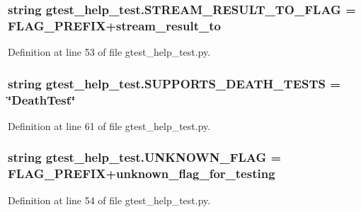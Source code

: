 \subsubsection[{\texorpdfstring{S\+T\+R\+E\+A\+M\+\_\+\+R\+E\+S\+U\+L\+T\+\_\+\+T\+O\+\_\+\+F\+L\+AG}{STREAM_RESULT_TO_FLAG}}]{\setlength{\rightskip}{0pt plus 5cm}string gtest\+\_\+help\+\_\+test.\+S\+T\+R\+E\+A\+M\+\_\+\+R\+E\+S\+U\+L\+T\+\_\+\+T\+O\+\_\+\+F\+L\+AG = {\bf F\+L\+A\+G\+\_\+\+P\+R\+E\+F\+IX}+\textquotesingle{}stream\+\_\+result\+\_\+to\textquotesingle{}}\hypertarget{namespacegtest__help__test_a06d67cce3cb57c484c169d1dbe4afd6c}{}\label{namespacegtest__help__test_a06d67cce3cb57c484c169d1dbe4afd6c}


Definition at line 53 of file gtest\+\_\+help\+\_\+test.\+py.

\subsubsection[{\texorpdfstring{S\+U\+P\+P\+O\+R\+T\+S\+\_\+\+D\+E\+A\+T\+H\+\_\+\+T\+E\+S\+TS}{SUPPORTS_DEATH_TESTS}}]{\setlength{\rightskip}{0pt plus 5cm}string gtest\+\_\+help\+\_\+test.\+S\+U\+P\+P\+O\+R\+T\+S\+\_\+\+D\+E\+A\+T\+H\+\_\+\+T\+E\+S\+TS = \char`\"{}Death\+Test\char`\"{}}\hypertarget{namespacegtest__help__test_a70c7e8b24ce75dfa26ff540b861cdc54}{}\label{namespacegtest__help__test_a70c7e8b24ce75dfa26ff540b861cdc54}


Definition at line 61 of file gtest\+\_\+help\+\_\+test.\+py.

\subsubsection[{\texorpdfstring{U\+N\+K\+N\+O\+W\+N\+\_\+\+F\+L\+AG}{UNKNOWN_FLAG}}]{\setlength{\rightskip}{0pt plus 5cm}string gtest\+\_\+help\+\_\+test.\+U\+N\+K\+N\+O\+W\+N\+\_\+\+F\+L\+AG = {\bf F\+L\+A\+G\+\_\+\+P\+R\+E\+F\+IX}+\textquotesingle{}unknown\+\_\+flag\+\_\+for\+\_\+testing\textquotesingle{}}\hypertarget{namespacegtest__help__test_a400934cf13530098af31e2a65f1a8d84}{}\label{namespacegtest__help__test_a400934cf13530098af31e2a65f1a8d84}


Definition at line 54 of file gtest\+\_\+help\+\_\+test.\+py.

